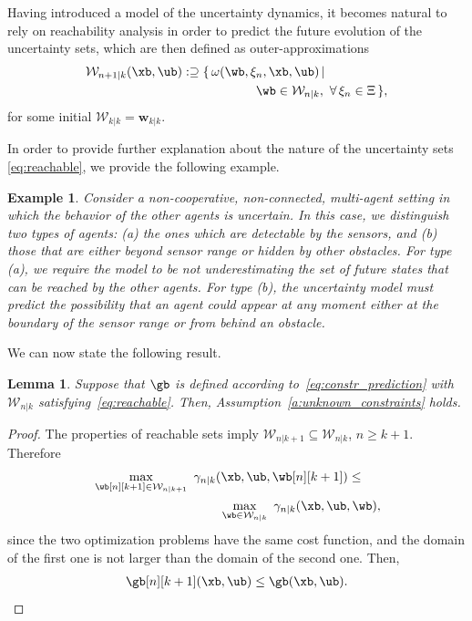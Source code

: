 \documentclass[journal]{IEEEtran}
\newcommand{\w}{{\mathbf{w}}}
\newcommand{\Wb}{\mathcal{{W}}}
\newtheorem{Lemma}{Lemma}
\newtheorem{Example}{Example}
\begin{document}
	Having introduced a model of the uncertainty dynamics, it becomes natural to rely on reachability analysis in order to predict the future evolution of  the uncertainty sets, which are then defined as outer-approximations
	\begin{align}\label{eq:reachable}
	\Wb_{n+1|k}(\xb,\ub) :\supseteq \{\, &\omega(\wb,\xi_{n},\xb,\ub)\, | \\&\hspace{3.5em} \wb\in\Wb_{n|k},\ \forall\,\xi_{n}\in\Xi \, \},\nonumber
	\end{align}
	for some initial $\mathcal{W}_{k|k}=\w_{k|k}$.
	
	In order to provide further explanation about the nature of the uncertainty sets \eqref{eq:reachable}, 
	we provide the following example.
	\begin{Example}
		\label{ex:set_consistency}
		Consider a non-cooperative, non-connected, multi-agent setting in which the behavior of the other agents is uncertain. In this case, we distinguish two types of agents: (a) the ones which are detectable by the sensors, and (b) those that are either beyond sensor range or hidden by other obstacles. For type (a), we require the model to be not underestimating the set of future states that can be reached by the other agents. For type (b), the uncertainty model must predict the possibility that an agent could appear at any moment either at the boundary of the sensor range or from behind an obstacle.
	\end{Example}
	We can now state the following result.
	\begin{Lemma}\label{lem:uncertainty}
		Suppose that $\gb$ is defined according to~\eqref{eq:constr_prediction} with $\mathcal{W}_{n|k}$ satisfying~\eqref{eq:reachable}. Then, Assumption~\ref{a:unknown_constraints} holds.
	\end{Lemma}
	\begin{proof}
		The properties of reachable sets imply $\Wb_{n|k+1}\subseteq\Wb_{n|k}$, $n\geq k+1$. Therefore
			\begin{align*}
			&\max_{\wb[n][k+1]\in\Wb_{n|k+1}} \ \gamma_{n|k}(\xb,\ub,\wb[n][k+1]) \leq{}\\ 
			&\hspace{10em}\max_{\wb\in\Wb_{n|k}} \ \gamma_{n|k}(\xb,\ub,\wb),
			\end{align*}
			since the two optimization problems have the same cost function, and the domain of the first one is not larger than the domain of the second one. Then,
			\begin{align*}
			\gb[n][k+1](\xb,\ub) \leq \gb(\xb,\ub).
			\end{align*}
	\end{proof}
\end{document}
